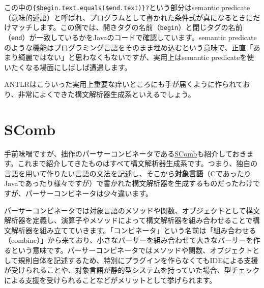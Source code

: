 \begin{Shaded}
\begin{Highlighting}[]
\CharTok{\textquotesingle{}\textless{}\textquotesingle{}}\CharTok{\textquotesingle{}\textgreater{}\textquotesingle{}}\CharTok{\textquotesingle{}\textgreater{}\textquotesingle{}}\NormalTok{ \{}
\NormalTok{)}
\end{Highlighting}
\end{Shaded}

この中の\texttt{\{\$begin.text.equals(\$end.text)\}?}という部分はsemantic
predicate（意味的述語）と呼ばれ、プログラムとして書かれた条件式が真になるときにだけマッチします。この例では、開きタグの名前（\texttt{begin}）と閉じタグの名前（\texttt{end}）が一致しているかをJavaのコードで確認しています。semantic
predicateのような機能はプログラミング言語をそのまま埋め込むという意味で、正直「あまり綺麗ではない」と思わなくもないですが、実用上はsemantic
predicateを使いたくなる場面にしばしば遭遇します。

ANTLRはこういった実用上重要な痒いところにも手が届くように作られており、非常によくできた構文解析器生成系といえるでしょう。

\hypertarget{chapter6-scomb}{%
\section{SComb}\label{chapter6-scomb}}

手前味噌ですが、拙作のパーサーコンビネータである\href{https://github.com/kmizu/scomb}{SComb}も紹介しておきます。これまで紹介してきたものはすべて構文解析器生成系です。つまり、独自の言語を用いて作りたい言語の文法を記述し、そこから\textbf{対象言語}（CであったりJavaであったり様々ですが）で書かれた構文解析器を生成するものだったわけですが、パーサーコンビネータは少々違います。

パーサーコンビネータでは対象言語のメソッドや関数、オブジェクトとして構文解析器を定義し、演算子やメソッドによって構文解析器を組み合わせることで構文解析器を組み立てていきます。「コンビネータ」という名前は「組み合わせる（combine）」から来ており、小さなパーサーを組み合わせて大きなパーサーを作るという意味です。パーサーコンビネータではメソッドや関数、オブジェクトとして規則自体を記述するため、特別にプラグインを作らなくてもIDEによる支援が受けられることや、対象言語が静的型システムを持っていた場合、型チェックによる支援を受けられることなどがメリットとして挙げられます。

